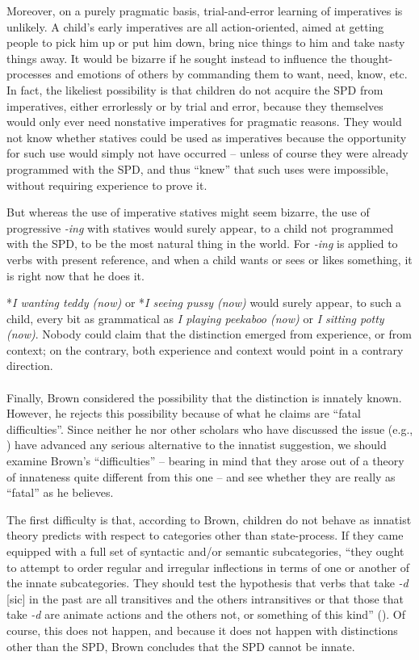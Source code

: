 Moreover, on a purely pragmatic basis, trial-and-error learning of imperatives is unlikely. A child's early imperatives are all action-oriented, aimed at getting people to pick him up or put him down, bring nice things to him and take nasty things away. It would be bizarre if he sought instead to influence the thought-processes and emotions of others by commanding them to want, need, know, etc. In fact, the likeliest possibility is that children do not acquire the SPD from imperatives, either errorlessly or by trial and error, because they themselves would only ever need nonstative imperatives for pragmatic reasons. They would not know whether statives could be used as imperatives because the opportunity for such use would simply not
have occurred -- unless of course they were already programmed with the SPD, and thus ``knew'' that such uses were impossible, without requiring experience to prove it.

But whereas the use of imperative statives might seem bizarre, the use of progressive \textit{-ing} with statives would surely appear, to a child not programmed with the SPD, to be the most natural thing in the world. For \textit{-ing} is applied to verbs with present reference, and when a child wants or sees or likes something, it is right now that he does it.

*\textit{I wanting teddy (now)} or *\textit{I seeing pussy (now)} would surely appear, to such a child, every bit as grammatical as \textit{I playing peekaboo (now)} or \textit{I sitting potty (now)}. Nobody could claim that the distinction emerged from experience, or from context; on the contrary, both experience and context would point in a contrary direction.\\\\

Finally, Brown considered the possibility that the distinction is innately known. However, he rejects this possibility because of what he claims are ``fatal difficulties''. Since neither he nor other scholars who have discussed the issue (e.g., \citealt{Kuczaj1978,Fletcher1979}) have advanced any serious alternative to the innatist suggestion, we should examine Brown's ``difficulties'' -- bearing in mind that they arose out of a theory of innateness quite different from this one -- and see whether they are really as ``fatal'' as he believes.

The first difficulty is that, according to Brown, children do not behave as innatist theory predicts with respect to categories other than state-process. If they came equipped with a full set of syntactic and/or semantic subcategories, ``they ought to attempt to order regular and irregular inflections in terms of one or another of the innate subcategories. They should test the hypothesis that verbs that take \textit{-d} [sic] in the past are all transitives and the others intransitives or that those that take \textit{-d} are animate actions and the others not, or something of this kind'' (\citeyear[328]{Brown1973}). Of course, this does not happen, and because it does not happen with distinctions other than the SPD, Brown concludes that the SPD cannot be innate.

